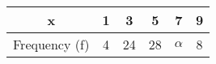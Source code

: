 \begin{center}
    \begin{tabular}{|c|c|c|c|c|c|}
    \hline
x           & 1  & 3  & 5  & 7  & 9  \\ \hline
Frequency (f) & 4  & 24 & 28 & $\alpha$ & 8  \\ \hline
\end{tabular}
\end{center}